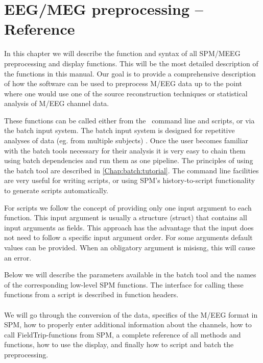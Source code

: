 \chapter{EEG/MEG preprocessing -- Reference \label{Chap:eeg:preprocessing}}

In this chapter we will describe the function and syntax of all SPM/MEEG preprocessing and display functions. This will be the most detailed description of the functions in this manual. Our goal is to provide a comprehensive description of how the software can be used to preprocess M/EEG data up to the point where one would use one of the source reconstruction techniques or statistical analysis of M/EEG channel data.

These functions can be called either from the \matlab\ command line and scripts, or via the batch input system. The batch input system is designed for repetitive analyses of data (eg. from multiple subjects) . Once the user becomes familiar with the batch tools necessary for their analysis it is very easy to chain them using batch dependencies and run them as one pipeline. The principles of  using the batch tool are described in \ref{Chap:batch:tutorial}. The command line facilities are very useful for writing scripts, or using SPM's history-to-script functionality to generate scripts automatically. 

For scripts  we follow the concept of providing only one input argument to each function. This input argument is usually a structure (struct) that contains all input arguments as fields. This approach has the advantage that the input does not need to follow a specific input argument order. For some arguments default values can be provided. When an obligatory argument is misisng, this will cause an error. 

Below we will describe the parameters available in the batch tool and the names of the corresponding low-level SPM functions. The interface for calling these functions from a script is described in function headers. 
\\
\\
We will go through the conversion of the data, specifics of the M/EEG format in SPM, how to properly enter additional information about the channels, how to call FieldTrip-functions from SPM, a complete reference of all methods and functions, how to use the display, and finally how to script and batch the preprocessing.

